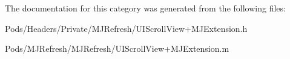 The documentation for this category was generated from the following files\+:\begin{DoxyCompactItemize}
\item 
Pods/\+Headers/\+Private/\+M\+J\+Refresh/U\+I\+Scroll\+View+\+M\+J\+Extension.\+h\item 
Pods/\+M\+J\+Refresh/\+M\+J\+Refresh/U\+I\+Scroll\+View+\+M\+J\+Extension.\+m\end{DoxyCompactItemize}
